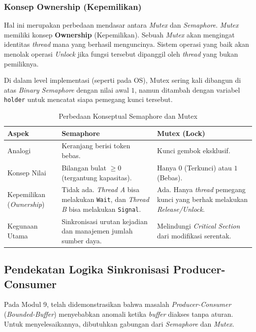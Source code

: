 \subsubsection{Konsep Ownership (Kepemilikan)}
Hal ini merupakan perbedaan mendasar antara \textit{Mutex} dan \textit{Semaphore}. \textit{Mutex} memiliki konsep \textbf{Ownership} (Kepemilikan). Sebuah \textit{Mutex} akan mengingat identitas \textit{thread} mana yang berhasil menguncinya. Sistem operasi yang baik
akan menolak operasi \textit{Unlock} jika fungsi tersebut dipanggil oleh \textit{thread} yang bukan pemiliknya.

Di dalam level implementasi (seperti pada OS), Mutex sering kali dibangun di atas \textit{Binary Semaphore} dengan nilai awal $1$, namun ditambah dengan variabel \texttt{holder} untuk mencatat siapa pemegang kunci tersebut.

\begin{table}[h]
	\centering
	\caption{Perbedaan Konseptual Semaphore dan Mutex}
	\begin{tabulary}{\textwidth}{|L|L|L|}
		\hline
		\textbf{Aspek} & \textbf{Semaphore} & \textbf{Mutex (Lock)} \\ \hline
		Analogi & Keranjang berisi token bebas. & Kunci gembok eksklusif. \\ \hline
		Konsep Nilai & Bilangan bulat $\geq 0$ (tergantung kapasitas). & Hanya $0$ (Terkunci) atau $1$ (Bebas). \\ \hline
		Kepemilikan (\textit{Ownership}) & Tidak ada. \textit{Thread A} bisa melakukan \texttt{Wait}, dan \textit{Thread B} bisa melakukan \texttt{Signal}. & Ada. Hanya \textit{thread} pemegang kunci yang berhak melakukan \textit{Release/Unlock}. \\ \hline
		Kegunaan Utama & Sinkronisasi urutan kejadian dan manajemen jumlah sumber daya. & Melindungi \textit{Critical Section} dari modifikasi serentak. \\ \hline
	\end{tabulary}
\end{table}

\subsection{Pendekatan Logika Sinkronisasi Producer-Consumer}

Pada Modul 9, telah didemonstrasikan bahwa masalah \textit{Producer-Consumer} (\textit{Bounded-Buffer}) menyebabkan anomali ketika \textit{buffer} diakses tanpa aturan. Untuk menyelesaikannya, dibutuhkan gabungan dari \textit{Semaphore} dan \textit{Mutex}.

